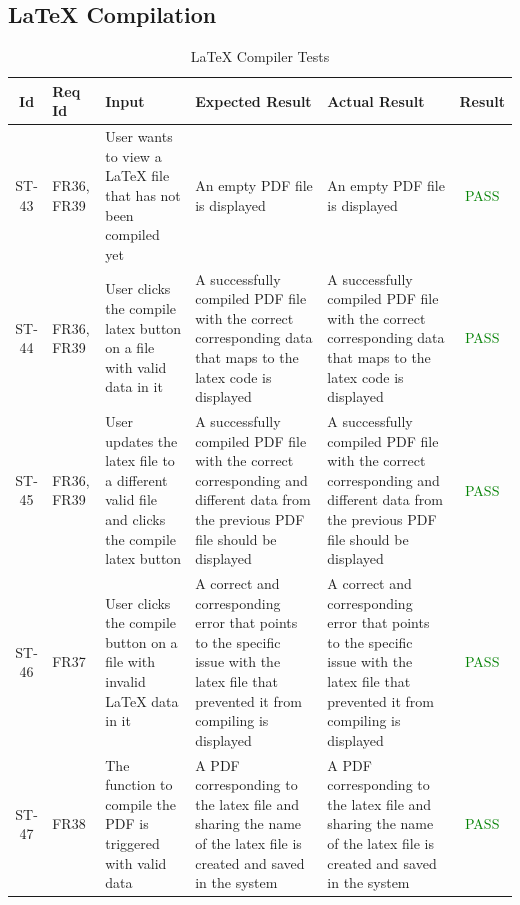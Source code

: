 \documentclass[12pt, titlepage]{article}
\begin{document}
\subsection{LaTeX Compilation}

\begin{center}
    \begin{longtable}{|c|p{1cm}|p{2.7cm}|p{3cm}|p{3cm}|c|}
        \caption{LaTeX Compiler Tests \label{long}}\\
        \hline
        \textbf{Id} & \textbf{Req Id} & \textbf{Input} & \textbf{Expected Result} & \textbf{Actual Result} & \textbf{Result}   \\
        \hline
        ST-43 & FR36, FR39 & User wants to view a LaTeX file that has not been compiled yet & An empty PDF file is displayed & An empty PDF file is displayed &  \textcolor{green}{PASS} \\
        \hline
        ST-44 & FR36, FR39 & User clicks the compile latex button on a file with valid data in it & A successfully compiled PDF file with the correct corresponding data that maps to the latex code is displayed & A successfully compiled PDF file with the correct corresponding data that maps to the latex code is displayed &  \textcolor{green}{PASS} \\
        \hline
        ST-45 & FR36, FR39 & User updates the latex file to a different valid file and clicks the compile latex button &  A successfully compiled PDF file with the correct corresponding and different data from the previous PDF file should be displayed &  A successfully compiled PDF file with the correct corresponding and different data from the previous PDF file should be displayed & \textcolor{green}{PASS} \\
        \hline
        ST-46 & FR37 &  User clicks the compile button on a file with invalid LaTeX data in it & A correct and corresponding error that points to the specific issue with the latex file that prevented it from compiling is displayed & A correct and corresponding error that points to the specific issue with the latex file that prevented it from compiling is displayed & \textcolor{green}{PASS} \\
        \hline
        ST-47 & FR38 & The function to compile the PDF is triggered with valid data & A PDF corresponding to the latex file and sharing the name of the latex file is created and saved in the system & A PDF corresponding to the latex file and sharing the name of the latex file is created and saved in the system & \textcolor{green}{PASS}\\
        \hline
    \end{longtable}
\end{center}
\end{document}
